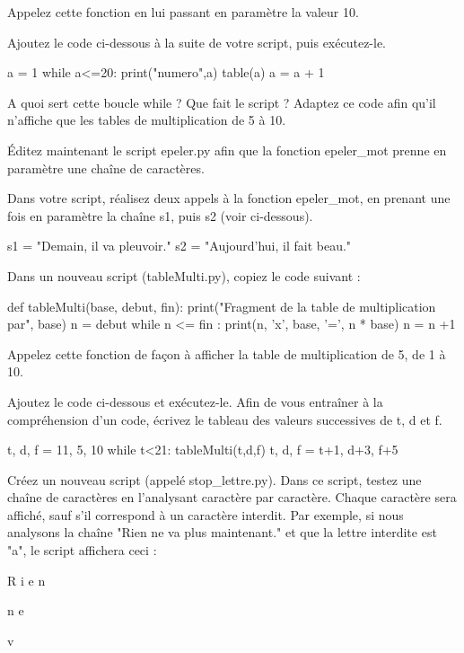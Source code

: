 Appelez cette fonction en lui passant en paramètre la valeur 10.

 Ajoutez le code ci-dessous à la suite de votre script, puis exécutez-le.
\begin{python}
a = 1
while a<=20:
  print("\nPasse numero",a)
  table(a)
  a = a + 1
\end{python}

A quoi sert cette boucle while ? Que fait le script ?
Adaptez ce code afin qu'il n'affiche que les tables de multiplication de 5 à 10.

 \'Editez maintenant le script epeler.py afin que la fonction epeler\_mot prenne en paramètre une chaîne de caractères.

Dans votre script, réalisez deux appels à la fonction epeler\_mot, en prenant une fois en paramètre la chaîne s1, puis s2 (voir ci-dessous).
\begin{python}
s1 = "Demain, il va pleuvoir."
s2 = "Aujourd'hui, il fait beau."
\end{python}


 Dans un nouveau script (tableMulti.py), copiez le code suivant :
\begin{python}
def tableMulti(base, debut, fin):
  print("Fragment de la table de multiplication par", base)
  n = debut
  while n <= fin :
    print(n, 'x', base, '=', n * base)
    n = n +1
\end{python}

Appelez cette fonction de fa\c con à afficher la table de multiplication de 5, de 1 à 10.

 Ajoutez le code ci-dessous et exécutez-le. Afin de vous entraîner à la
compréhension d'un code, écrivez le tableau des valeurs successives de t, d et f.

\begin{python}
t, d, f = 11, 5, 10
while t<21:
  tableMulti(t,d,f)
  t, d, f = t+1, d+3, f+5
\end{python}

 Créez un nouveau script (appelé stop\_lettre.py). Dans ce script, testez une chaîne de caractères en l'analysant caractère par caractère. Chaque caractère sera
affiché, sauf s'il correspond à un caractère interdit. Par exemple, si nous analysons la chaîne "Rien ne va plus maintenant." et que la lettre interdite est "a", le script affichera ceci :

\vspace{0.1cm}
R i e n

n e

v


